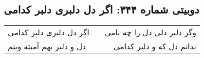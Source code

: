 \begin{center}
\section*{دوبیتی شماره ۳۴۴: اگر دل دلبری دلبر کدامی}
\label{sec:344}
\begin{longtable}{l p{0.5cm} r}
اگر دل دلبری دلبر کدامی
&&
وگر دلبر دلی دل را چه نامی
\\
دل و دلبر بهم آمیته وینم
&&
ندانم دل که و دلبر کدامی
\\
\end{longtable}
\end{center}
